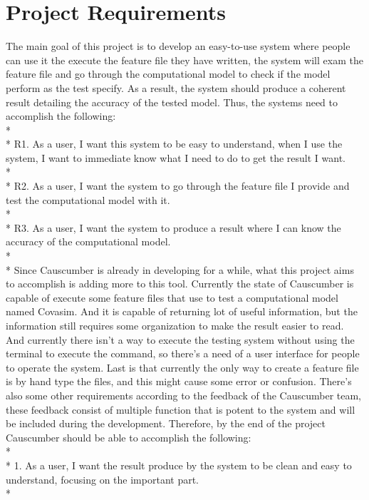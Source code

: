 \section{Project Requirements}

The main goal of this project is to develop an easy-to-use system where people can use it the execute the feature file they have written, the system will exam the feature file and go through the computational model to check if the model perform as the test specify. As a result, the system should produce a coherent result detailing the accuracy of the tested model. Thus, the systems need to accomplish the following:\\*
\\*
R1. As a user, I want this system to be easy to understand, when I use the system, I want to immediate know what I need to do to get the result I want.\\*
\\*
R2. As a user, I want the system to go through the feature file I provide and test the computational model with it.\\*
\\*
R3. As a user, I want the system to produce a result where I can know the accuracy of the computational model.\\*
\\*
Since Causcumber is already in developing for a while, what this project aims to accomplish is adding more to this tool. Currently the state of Causcumber is capable of execute some feature files that use to test a computational model named Covasim. And it is capable of returning lot of useful information, but the information still requires some organization to make the result easier to read. And currently there isn’t a way to execute the testing system without using the terminal to execute the command, so there’s a need of a user interface for people to operate the system. Last is that currently the only way to create a feature file is by hand type the files, and this might cause some error or confusion. There’s also some other requirements according to the feedback of the Causcumber team, these feedback consist of multiple function that is potent to the system and will be included during the development. Therefore, by the end of the project Causcumber should be able to accomplish the following:\\*
\\*
1.	As a user, I want the result produce by the system to be clean and easy to understand, focusing on the important part.\\*
